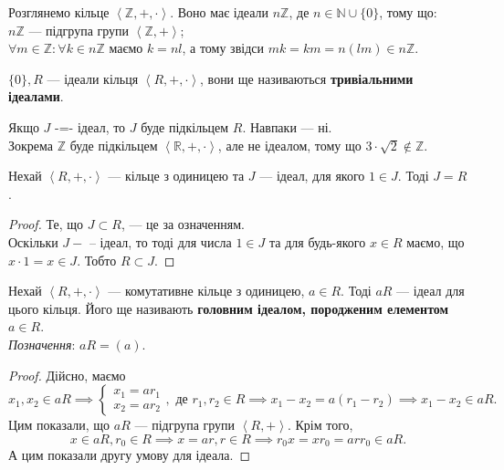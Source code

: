 \documentclass{math_library}
\begin{document}
\begin{example}
Розглянемо кільце $\left< \mathbb{Z},+,\cdot \right>$. Воно має ідеали $n \mathbb{Z}$, де $n \in \mathbb{N} \cup \{0\}$, тому що:\\
$n\mathbb{Z}$ --- підгрупа групи $\left<\mathbb{Z},+ \right>$;\\
$\forall m \in \mathbb{Z}: \forall k \in n\mathbb{Z}$ маємо $k = nl$, а тому звідси $mk = km = n(lm) \in n\mathbb{Z}$.
\end{example}

\begin{example}
$\{0\}, R$ --- ідеали кільця $\left<R,+,\cdot \right>$, вони ще називаються \textbf{тривіальними ідеалами}.
\end{example}

\begin{remark}
Якщо $J$ -=- ідеал, то $J$ буде підкільцем $R$. Навпаки --- ні.
\bigskip \\
Зокрема $\mathbb{Z}$ буде підкільцем $\left<\mathbb{R},+,\cdot\right>$, але не ідеалом, тому що $3 \cdot \sqrt{2} \not \in \mathbb{Z}$.
\end{remark}

\begin{proposition}
Нехай $\left<R,+,\cdot \right>$ --- кільце з одиницею та $J$ --- ідеал, для якого $1 \in J$. Тоді $J = R$.
\end{proposition}

\begin{proof}
Те, що $J \subset R$, --- це за означенням.\\
Оскільки $J-$ -- ідеал, то тоді для числа $1 \in J$ та для будь-якого $x \in R$ маємо, що $x \cdot 1 = x \in J$. Тобто $R \subset J$.
\end{proof}

\begin{lemma}
Нехай $\left<R,+,\cdot \right>$ --- комутативне кільце з одиницею, $a \in R$. Тоді $aR$ --- ідеал для цього кільця. Його ще називають \textbf{головним ідеалом, породженим елементом} $a \in R$.\\
\textit{Позначення}: $aR = (a)$.
\end{lemma}

\begin{proof}
Дійсно, маємо
\[
x_1,x_2 \in aR \implies \begin{cases} x_1 = ar_1 \\ x_2 = ar_2 \end{cases}, \text{ де } r_1,r_2 \in R \implies x_1-x_2 = a(r_1-r_2) \implies x_1-x_2 \in aR.
\]
Цим показали, що $aR$ --- підгрупа групи $\left<R,+ \right>$. Крім того,
\[
x \in aR,r_0 \in R \implies x = ar, r \in R \implies r_0 x = xr_0 = arr_0 \in aR.
\]
А цим показали другу умову для ідеала.
\end{proof}
\end{document}
